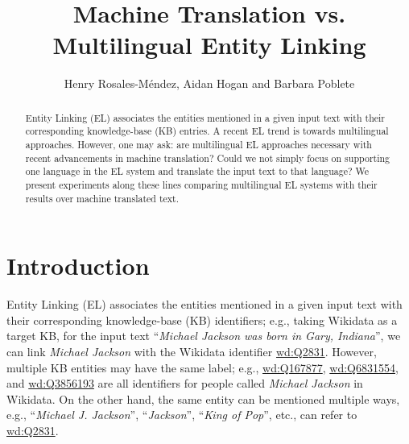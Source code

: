 \documentclass{llncs}
\begin{document}
\title{Machine Translation vs.\\Multilingual Entity Linking}
%
%
\author{Henry Rosales-M\'endez, Aidan Hogan and Barbara Poblete}
%
%
%

\maketitle              %
\begin{abstract}
Entity Linking (EL) associates the entities mentioned in a given input text with their corresponding knowledge-base (KB) entries. A recent EL trend is towards multilingual approaches. However, one may ask: are multilingual EL approaches necessary with recent advancements in machine translation? Could we not simply focus on supporting one language in the EL system and translate the input text to that language? We present experiments along these lines comparing multilingual EL systems with their results over machine translated text.
\end{abstract}


\section{Introduction}
\label{sec:intro}

Entity Linking (EL) associates the entities mentioned in a given input text with their corresponding knowledge-base (KB) identifiers; e.g., taking Wikidata as a target KB, for the input text ``\textit{Michael Jackson was born in Gary, Indiana}'', we can link \textit{Michael Jackson} with the Wikidata identifier \url{wd:Q2831}. However, multiple KB entities may have the same label; e.g., \url{wd:Q167877}, \url{wd:Q6831554}, and \url{wd:Q3856193} are all identifiers for people called \textit{Michael Jackson} in Wikidata. On the other hand, the same entity can be mentioned multiple ways, e.g., ``\textit{Michael J. Jackson}'', ``\textit{Jackson}'', ``\textit{King of Pop}'', etc., can refer to \url{wd:Q2831}.
\end{document}
